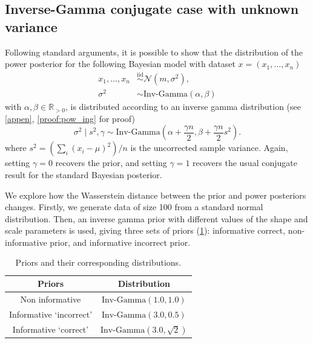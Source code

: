 \documentclass[12pt]{article}
\begin{document}
\subsection{Inverse-Gamma conjugate case with unknown variance}
Following standard arguments, it is possible to show that the distribution of
the power posterior for the following Bayesian model with dataset $x = (x_1,
\ldots, x_n)$
\begin{subequations}
\begin{align}
x_1, \ldots, x_n &\overset{\mathrm{iid}}{\sim} \mathcal{N}(m, \sigma^2), \\
\sigma^2 &\sim \text{Inv-Gamma}(\alpha, \beta)
\end{align}
\end{subequations}
with $\alpha, \beta \in \mathbb{R}_{>0}$, is distributed according to an
inverse gamma distribution (see \cref{appen}, \cref{proof:pow_ing} for proof)
\begin{equation*}
\sigma^2 \; | \; s^2, \gamma \sim \text{Inv-Gamma}\left( \alpha + \frac{\gamma n}{2}, \beta + \frac{\gamma n}{2} s^2 \right). 
\end{equation*}
where $s^2 = (\sum_{i} \left( x_i - \mu \right)^2)/n$ is the uncorrected sample
variance. Again, setting $\gamma = 0$ recovers the prior, and setting $\gamma =
1$ recovers the usual conjugate result for the standard Bayesian posterior.

We explore how the Wasserstein distance between the prior and power posteriors changes. Firstly, we generate data of size 100 from a standard normal distribution. Then, an inverse gamma prior with different values of the shape and scale parameters is used, giving three sets of priors (\cref{priors_invg}): informative correct, non-informative prior, and informative incorrect prior.

\begin{table}[h!]
	\caption{Priors and their corresponding distributions.}
	\renewcommand{\arraystretch}{1.5}
	\centering
	\begin{tabular}{cc}
	\toprule
		Priors      & Distribution  \\
		\midrule
		Non informative    &  $\text{Inv-Gamma}(1.0, 1.0)$  \\
		Informative `incorrect'   & $\text{Inv-Gamma}(3.0, 0.5)$    \\
		Informative    `correct'  & $\text{Inv-Gamma}(3.0, \sqrt{2})$\\
		\bottomrule
	\end{tabular}
	\label{priors_invg}
\end{table}
\end{document}
